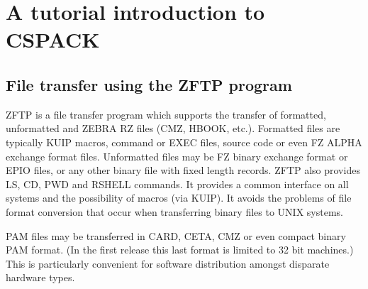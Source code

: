 \chapter{A tutorial introduction to CSPACK}
\section{File transfer using the ZFTP program}
\par
ZFTP is a file transfer program which supports the transfer of formatted,
unformatted and ZEBRA RZ files (CMZ, HBOOK, etc.).
Formatted files are typically KUIP
macros, command or EXEC files, source code or even FZ ALPHA exchange
format files. Unformatted files may be FZ binary exchange format or EPIO
files, or any other binary file with fixed length records.
ZFTP also provides LS, CD, PWD and RSHELL commands.
It provides a common interface on all systems and the possibility of
macros (via KUIP). It avoids the problems of file format
conversion that occur when transferring binary files to UNIX systems.
\par
PAM files may be transferred in CARD, CETA, CMZ or even compact binary
PAM format. (In the first release this last format is limited to 32 bit
machines.) This is particularly convenient for software distribution
amongst disparate hardware types.
